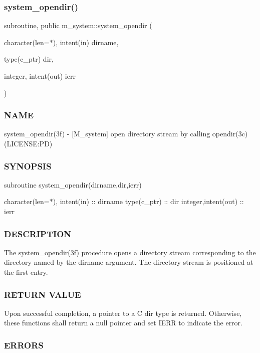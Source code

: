 \subsubsection{\texorpdfstring{system\+\_\+opendir()}{system\_opendir()}}
{\footnotesize\ttfamily subroutine, public m\+\_\+system\+::system\+\_\+opendir (\begin{DoxyParamCaption}\item[{character(len=$\ast$), intent(in)}]{dirname,  }\item[{type(c\+\_\+ptr)}]{dir,  }\item[{integer, intent(out)}]{ierr }\end{DoxyParamCaption})}



\subsubsection*{N\+A\+ME}

system\+\_\+opendir(3f) -\/ \mbox{[}M\+\_\+system\mbox{]} open directory stream by calling opendir(3c) (L\+I\+C\+E\+N\+SE\+:PD) \subsubsection*{S\+Y\+N\+O\+P\+S\+IS}

subroutine system\+\_\+opendir(dirname,dir,ierr)

character(len=$\ast$), intent(in) \+:\+: dirname type(c\+\_\+ptr) \+:\+: dir integer,intent(out) \+:\+: ierr

\subsubsection*{D\+E\+S\+C\+R\+I\+P\+T\+I\+ON}

The system\+\_\+opendir(3f) procedure opens a directory stream corresponding to the directory named by the dirname argument. The directory stream is positioned at the first entry.

\subsubsection*{R\+E\+T\+U\+RN V\+A\+L\+UE}

Upon successful completion, a pointer to a C dir type is returned. Otherwise, these functions shall return a null pointer and set I\+E\+RR to indicate the error.

\subsubsection*{E\+R\+R\+O\+RS}

